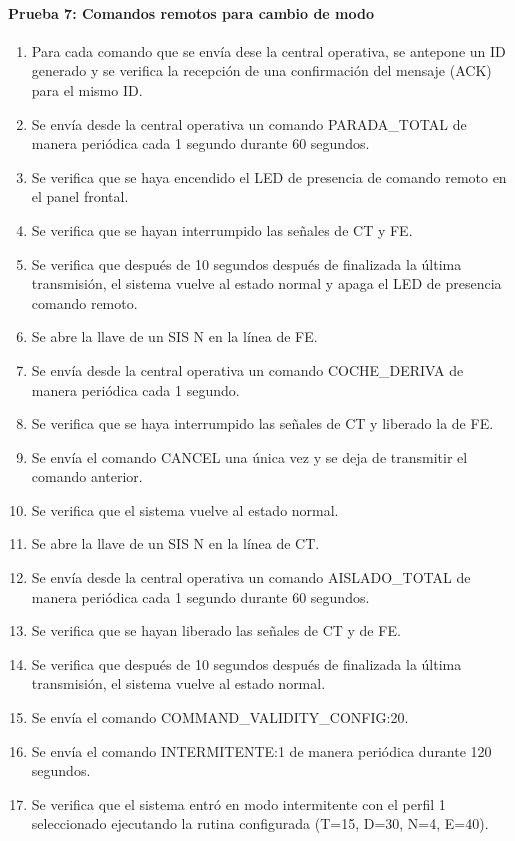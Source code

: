 \paragraph{Prueba 7: Comandos remotos para cambio de modo}
\begin{enumerate}
\item	Para cada comando que se envía dese la central operativa, se antepone un ID generado y se verifica la recepción de una confirmación del mensaje (ACK) para el mismo ID.
\item	Se envía desde la central operativa un comando PARADA\_TOTAL de manera periódica cada 1 segundo durante 60 segundos.
\item	Se verifica que se haya encendido el LED de presencia de comando remoto en el panel frontal.
\item	Se verifica que se hayan interrumpido las señales de CT y FE.
\item	Se verifica que después de 10 segundos después de finalizada la última transmisión, el sistema vuelve al estado normal y apaga el LED de presencia comando remoto.
\item	Se abre la llave de un SIS N en la línea de FE.
\item	Se envía desde la central operativa un comando COCHE\_DERIVA de manera periódica cada 1 segundo.
\item	Se verifica que se haya interrumpido las señales de CT y liberado la de FE.
\item	Se envía el comando CANCEL una única vez y se deja de transmitir el comando anterior.
\item	Se verifica que el sistema vuelve al estado normal.
\item	Se abre la llave de un SIS N en la línea de CT.
\item	Se envía desde la central operativa un comando AISLADO\_TOTAL de manera periódica cada 1 segundo durante 60 segundos.
\item	Se verifica que se hayan liberado las señales de CT y de FE.
\item	Se verifica que después de 10 segundos después de finalizada la última transmisión, el sistema vuelve al estado normal.
\item	Se envía el comando COMMAND\_VALIDITY\_CONFIG:20.
\item	Se envía el comando INTERMITENTE:1 de manera periódica durante 120 segundos.
\item	Se verifica que el sistema entró en modo intermitente con el perfil 1 seleccionado ejecutando la rutina configurada (T=15, D=30, N=4, E=40).

\end{enumerate}
